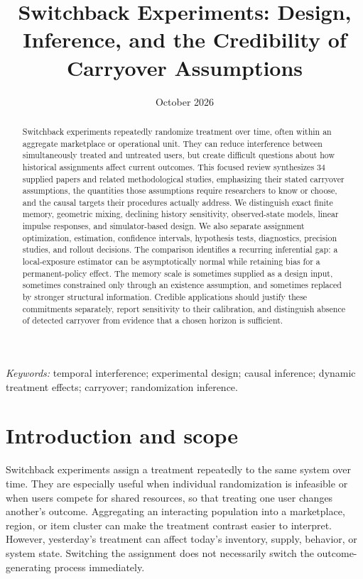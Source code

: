 \documentclass[12pt]{article}
\title{\textbf{Switchback Experiments: Design, Inference, and the Credibility of Carryover Assumptions}}
\author{}
\date{October 2026}
\begin{document}
\singlespacing
\maketitle
\begin{abstract}
Switchback experiments repeatedly randomize treatment over time, often within an aggregate marketplace or operational unit. They can reduce interference between simultaneously treated and untreated users, but create difficult questions about how historical assignments affect current outcomes. This focused review synthesizes 34 supplied papers and related methodological studies, emphasizing their stated carryover assumptions, the quantities those assumptions require researchers to know or choose, and the causal targets their procedures actually address. We distinguish exact finite memory, geometric mixing, declining history sensitivity, observed-state models, linear impulse responses, and simulator-based design. We also separate assignment optimization, estimation, confidence intervals, hypothesis tests, diagnostics, precision studies, and rollout decisions. The comparison identifies a recurring inferential gap: a local-exposure estimator can be asymptotically normal while retaining bias for a permanent-policy effect. The memory scale is sometimes supplied as a design input, sometimes constrained only through an existence assumption, and sometimes replaced by stronger structural information. Credible applications should justify these commitments separately, report sensitivity to their calibration, and distinguish absence of detected carryover from evidence that a chosen horizon is sufficient.
\end{abstract}
\noindent\textit{Keywords:} temporal interference; experimental design; causal inference; dynamic treatment effects; carryover; randomization inference.
\clearpage
\tableofcontents
\clearpage
{} %

\section{Introduction and scope}\label{sec:introduction}

Switchback experiments assign a treatment repeatedly to the same system over time. They are especially useful when individual randomization is infeasible or when users compete for shared resources, so that treating one user changes another's outcome. Aggregating an interacting population into a marketplace, region, or item cluster can make the treatment contrast easier to interpret. However, yesterday's treatment can affect today's inventory, supply, behavior, or system state. Switching the assignment does not necessarily switch the outcome-generating process immediately.
\end{document}
